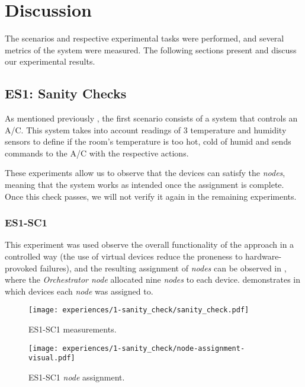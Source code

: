 \section{Discussion}\label{sec:evaluation_discussion}

The scenarios and respective experimental tasks were performed, and several metrics of the system were measured. The following sections present and discuss our experimental results.

\subsection{ES1: Sanity Checks}\label{sec:discussion_scenario1}

As mentioned previously , the first scenario consists of a system that controls an A/C. This system takes into account readings of 3 temperature and humidity sensors to define if the room's temperature is too hot, cold of humid and sends commands to the A/C with the respective actions.

These experiments allow us to observe that the devices can satisfy the \textit{nodes}, meaning that the system works as intended once the assignment is complete. Once this check passes, we will not verify it again in the remaining experiments.


\subsubsection{ES1-SC1}\label{sec:sanity_check_exp}

This experiment was used observe the overall functionality of the approach in a controlled way (the use of virtual devices reduce the proneness to hardware-provoked failures), and the resulting assignment of \textit{nodes} can be observed in , where the \textit{Orchestrator node} allocated nine \textit{nodes} to each device.  demonstrates in which devices each \textit{node} was assigned to.

\begin{figure}[h]
\centering
\texttt{[image: experiences/1-sanity\_check/sanity\_check.pdf]}
\caption[ES1-SC1 measurements.]{ES1-SC1 measurements.}\label{fig:sanity_check_graph}
\end{figure}

\begin{figure}[H]
\centering
\texttt{[image: experiences/1-sanity\_check/node-assignment-visual.pdf]}
\caption[ES1-SC1 \textit{node} assignment.]{ES1-SC1 \textit{node} assignment.}\label{fig:sanity_check_node_assignment_visual}
\end{figure}

